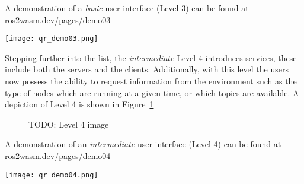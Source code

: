        \begin{tcolorbox}[title=Example 3]
            \begin{minipage}[t]{0.87\linewidth}
                \vspace*{0.5\baselineskip}
                A demonstration of a \textit{basic} user interface (Level 3) can
                be found at \href{https://ros2wasm.dev/pages/demo03/index.html}{\textsf{ros2wasm.dev/pages/demo03}}
            \end{minipage}\hfill%
            \begin{minipage}[t]{0.1\linewidth}
                \vspace*{0pt}
                \texttt{[image: qr\_demo03.png]}
            \end{minipage}
        \end{tcolorbox}



        Stepping further into the list, the \textit{intermediate} Level 4 introduces
        services, these include both the servers and the clients. Additionally,
        with this level the users now possess the ability to request information
        from the environment such as the type of nodes which are running at a
        given time, or which topics are available. A depiction of Level 4 is shown
        in Figure~\ref{fig:ui4}

        \begin{figure}[htbp]
            \centering
            \caption{TODO: Level 4 image}\label{fig:ui4}
        \end{figure}

        \begin{tcolorbox}[title=Example 4]
            \begin{minipage}[t]{0.87\linewidth}
                \vspace*{0.5\baselineskip}
                A demonstration of an \textit{intermediate} user interface (Level 4) can
                be found at \href{https://ros2wasm.dev/pages/demo04/index.html}{\textsf{ros2wasm.dev/pages/demo04}}
            \end{minipage}\hfill%
            \begin{minipage}[t]{0.1\linewidth}
                \vspace*{0pt}
                \texttt{[image: qr\_demo04.png]}
            \end{minipage}
        \end{tcolorbox}



